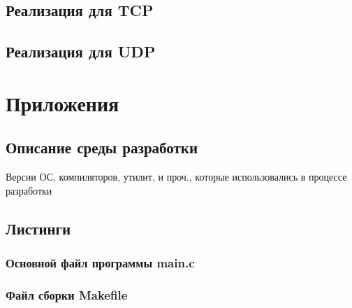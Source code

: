 \documentclass[12pt,a4paper]{report}
\begin{document}
\section{Реализация для TCP}
\section{Реализация для UDP}

\chapter*{Приложения}
\section*{Описание среды разработки}
Версии ОС, компиляторов, утилит, и проч., которые использовались в процессе разработки
\section*{Листинги}
\subsection*{Основной файл программы main.c}

\subsection*{Файл сборки Makefile}

\end{document}
